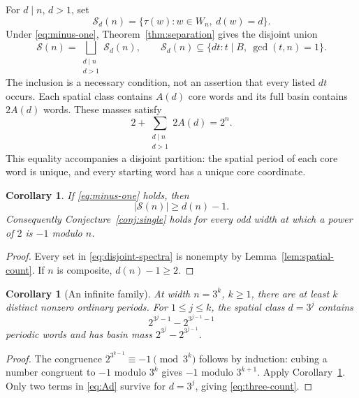 \documentclass[11pt]{article}
\newtheorem{corollary}[theorem]{Corollary}
\theoremstyle{definition}
\theoremstyle{remark}
\numberwithin{equation}{section}
\newcommand{\Spec}{\mathcal S}
\begin{document}
For $d\mid n$, $d>1$, set
\[
 \Spec_d(n)=\{\tau(w):w\in W_n,\ d(w)=d\}.
\]
Under \eqref{eq:minus-one}, Theorem~\ref{thm:separation} gives the
disjoint union
\begin{equation}\label{eq:disjoint-spectra}
 \Spec(n)=\bigsqcup_{\substack{d\mid n\\d>1}}\Spec_d(n),
 \qquad \Spec_d(n)\subseteq
 \{dt:t\mid B,\ \gcd(t,n)=1\}.
\end{equation}
The inclusion is a necessary condition, not an assertion that every
listed $dt$ occurs. Each spatial class contains $A(d)$ core words and
its full basin contains $2A(d)$ words. These masses satisfy
\begin{equation}\label{eq:mass-accounting}
 2+\sum_{\substack{d\mid n\\d>1}}2A(d)=2^n.
\end{equation}
This equality accompanies a disjoint partition: the spatial period of
each core word is unique, and every starting word has a unique core
coordinate.

\begin{corollary}\label{cor:divisor-bound}
If \eqref{eq:minus-one} holds, then
\begin{equation}\label{eq:divisor-bound}
 |\Spec(n)|\ge d(n)-1.
\end{equation}
Consequently Conjecture~\ref{conj:single} holds for every odd width at
which a power of $2$ is $-1$ modulo $n$.
\end{corollary}

\begin{proof}
Every set in \eqref{eq:disjoint-spectra} is nonempty by
Lemma~\ref{lem:spatial-count}. If $n$ is composite, $d(n)-1\ge2$.
\end{proof}

\begin{corollary}[An infinite family]\label{cor:three-powers}
At width $n=3^k$, $k\ge1$, there are at least $k$ distinct nonzero
ordinary periods. For $1\le j\le k$, the spatial class $d=3^j$ contains
\begin{equation}\label{eq:three-count}
 2^{3^j-1}-2^{3^{j-1}-1}
\end{equation}
periodic words and has basin mass $2^{3^j}-2^{3^{j-1}}$.
\end{corollary}

\begin{proof}
The congruence $2^{3^{k-1}}\equiv-1\pmod{3^k}$ follows by induction:
cubing a number congruent to $-1$ modulo $3^k$ gives $-1$ modulo
$3^{k+1}$. Apply Corollary~\ref{cor:divisor-bound}. Only two terms in
\eqref{eq:Ad} survive for $d=3^j$, giving \eqref{eq:three-count}.
\end{proof}
\end{document}
